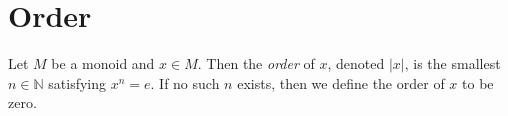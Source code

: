 \section{Order}

\begin{definition}
    \label{definition : order}
    \leanok
    Let $M$ be a monoid and $x \in M$. Then the \textit{order} of $x$, denoted $|x|$, is the smallest $n \in \mathbb{N}$ satisfying $x^n = e$. If no such $n$ exists, then we define the order of $x$ to be zero.
\end{definition}
